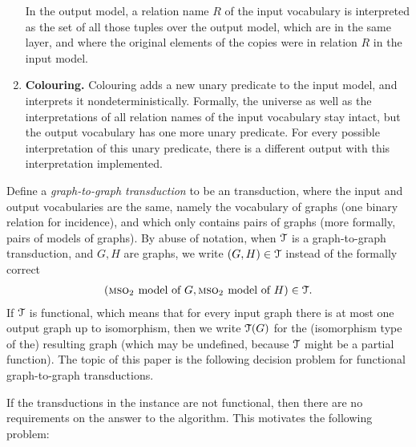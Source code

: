 \begin{definition}
\begin{enumerate}
	In the output model, a relation name $R$ of the input vocabulary is interpreted as the set of all those tuples over the output model, which are in the same layer, and  where the original elements of the copies were in relation $R$
	in the input model.
	\item {\bf Colouring.} \label{mso-trans:colouring} Colouring adds  a new unary predicate to the input model, and interprets it nondeterministically. Formally, the universe as well as the interpretations of all relation names of the input vocabulary stay intact,
	but the output vocabulary has one more unary predicate. For every possible interpretation of this unary predicate, there is a different output with this interpretation implemented.
\end{enumerate}
\end{definition}

  Define a \emph{graph-to-graph \mso transduction} to be an \mso transduction, where the input and output vocabularies are the same, namely the vocabulary of graphs (one binary relation for incidence), and which only contains pairs of graphs (more formally, pairs of \msotwo models of graphs).  By abuse of notation, when ${\mathcal T}$ is a graph-to-graph \mso transduction, and $G,H$ are graphs, we write $(G,H) \in {\mathcal T}$ instead of the formally correct 
\begin{align*}
(\text{{\sc mso$_2$ }model of $G$}, \text{{\sc mso$_2$ }model of $H$})\in {\mathcal T}.
\end{align*}
If ${\mathcal T}$ is functional, which means that for every input graph there is at most one output graph up to isomorphism, then we write ${\mathcal T}(G)$ for the (isomorphism type of the) resulting graph (which may be undefined, because ${\mathcal T}$ might be a partial function).
The topic of this paper is   the following  decision problem for functional \mso graph-to-graph transductions. 



If the  transductions in the instance are not functional, then there are no requirements on the answer to the algorithm. This motivates the following problem:

    
